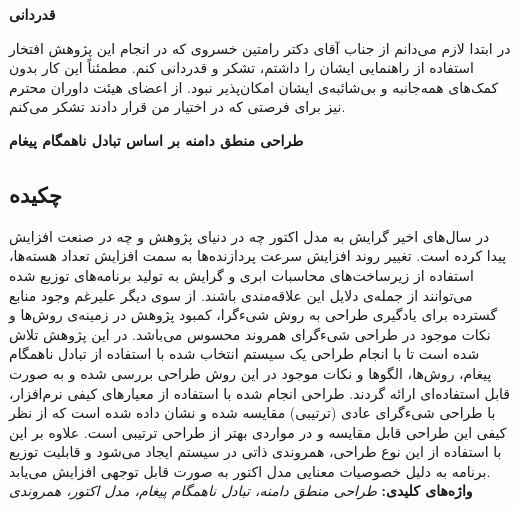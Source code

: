 \documentclass[oneside, a4paper,11pt]{book}
\numberwithin{equation}{chapter}
\numberwithin{table}{chapter}
\numberwithin{figure}{chapter}
\numberwithin{equation}{chapter}
\begin{document}
\newpage
\thispagestyle{empty}
\mbox{}

\newpage
\thispagestyle{empty}
\begin{center}
\large{\bfseries{قدردانی}}\\
\end{center}
‎در ابتدا لازم می‌دانم از جناب آقای دکتر رامتین خسروی که در انجام این پژوهش  افتخار استفاده از راهنمایی ایشان را داشتم، تشکر و قدردانی کنم. مطمئناً این کار بدون کمک‌های همه‌جانبه و بی‌شائبه‌ی ایشان امکان‌پذیر نبود. از اعضای هیئت داوران محترم نیز برای فرصتی که در اختیار من قرار دادند تشکر می‌کنم.

\newpage
\thispagestyle{empty}
\mbox{}


\pagestyle{plain}

\newpage
{\centering\large{\bf{طراحی منطق دامنه بر اساس تبادل ناهمگام پیغام}} \par}
\subsection*{چکیده}
در سال‌های اخیر گرایش به مدل اکتور چه در دنیای پژوهش و چه در صنعت افزایش پیدا کرده است. تغییر روند افزایش سرعت پردازنده‌ها به سمت افزایش تعداد هسته‌ها، استفاده از زیرساخت‌های محاسبات ابری و گرایش به تولید برنامه‌های توزیع شده می‌توانند از جمله‌ی دلایل این علاقه‌مندی باشند. از سوی دیگر علیرغم وجود منابع گسترده برای یادگیری طراحی به روش شیءگرا، کمبود پژوهش در زمینه‌ی روش‌ها و نکات موجود در طراحی شیءگرای همروند محسوس می‌باشد. در این پژوهش تلاش شده است تا با انجام طراحی یک سیستم انتخاب شده با استفاده از تبادل ناهمگام پیغام، روش‌ها،‌ الگوها و نکات موجود در این روش طراحی بررسی شده و به صورت قابل استفاده‌ای ارائه گردند. طراحی انجام شده با استفاده از معیارهای کیفی نرم‌افزار، با طراحی شیءگرای عادی (ترتیبی) مقایسه شده و نشان داده شده است که از نظر کیفی این طراحی قابل مقایسه و در مواردی بهتر از طراحی ترتیبی است. علاوه بر این با استفاده از این نوع طراحی،‌ همروندی ذاتی در سیستم ایجاد می‌شود و قابلیت توزیع برنامه به دلیل خصوصیات معنایی مدل اکتور به صورت قابل توجهی افزایش می‌یابد.\\

\textbf{واژه‌های کلیدی: }\textit{ طراحی منطق دامنه، تبادل ناهمگام پیغام، مدل اکتور، همروندی}



\newpage
\thispagestyle{empty}
\mbox{}

\small{
\tableofcontents
\listoffigures
}


\newpage


\pagestyle{fancy}
\fancyhead{} 
\fancyhead[RO]{\leftmark}
\fancyhead[LO]{\thepage}
\fancyhead[LE]{\rightmark}
\fancyhead[RE]{\thepage}
\fancyfoot{} 
\renewcommand{\headrulewidth}{0.6pt} 
\renewcommand{\footrulewidth}{0pt}
\end{document}

